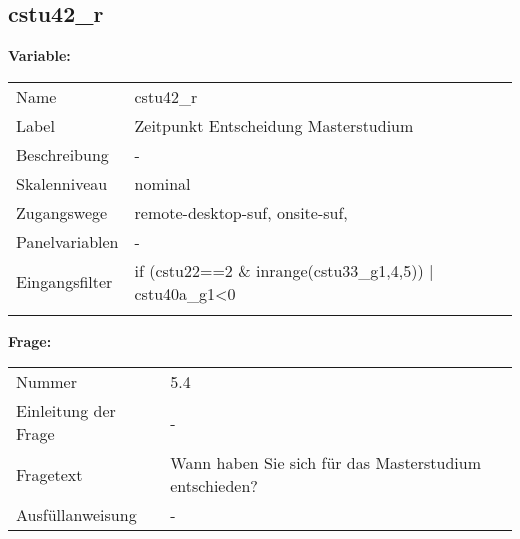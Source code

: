 	
	
	\subsection{cstu42\_r}
	\label{subSection:cstu42_r}

	\noindent\textbf{Variable:}\\
		\begin{tabular}{lL{11.3cm}}
			\label{tableVariable:cstu42_r}
			Name & cstu42\_r \\
			Label & Zeitpunkt Entscheidung Masterstudium \\
			Beschreibung & - \\
			Skalenniveau & nominal \\
			Zugangswege &
				remote-desktop-suf,
				onsite-suf,
 \\
			Panelvariablen & -
			 \\
			Eingangsfilter & if (cstu22==2 \& inrange(cstu33\_g1,4,5)) | cstu40a\_g1\textless{}0 \\
 \\
		\end{tabular}

		\vspace*{1 cm}
		\noindent\textbf{Frage:}\\
		\begin{tabular}{lL{11.3cm}}
			\label{tableQuestion:cstu42_r}
			Nummer & 5.4 \\
			Einleitung der Frage & - \\
			Fragetext & Wann haben Sie sich für das Masterstudium entschieden? \\
			Ausfüllanweisung & - \\
		\end{tabular}





